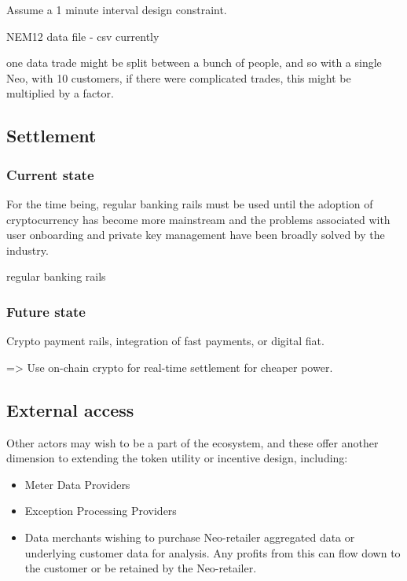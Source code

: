 \documentclass{article}
\theoremstyle{definition}
\theoremstyle{plain} %
\begin{document}
Assume a 1 minute interval design constraint.

NEM12 data file - csv currently

one data trade might be split between a bunch of people, and so with a single Neo, with 10 customers, if there were complicated trades, this might be multiplied by a factor.




\subsection{Settlement}

\subsubsection{Current state}

\noindent For the time being, regular banking rails must be used until the adoption of cryptocurrency has become more mainstream and the problems associated with user onboarding and private key management have been broadly solved by the industry. 

regular banking rails

\subsubsection{Future state}

Crypto payment rails, integration of fast payments, or digital fiat.

=> Use on-chain crypto for real-time settlement for cheaper power.


\subsection{External access}

Other actors may wish to be a part of the ecosystem, and these offer another dimension to extending the token utility or incentive design, including:

\begin{itemize}
\item{Meter Data Providers}
\item{Exception Processing Providers}
\item{Data merchants wishing to purchase Neo-retailer aggregated data or underlying customer data for analysis. Any profits from this can flow down to the customer or be retained by the Neo-retailer.}
\end{itemize}
\end{document}
